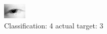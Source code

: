 \begin{figure}[h!]
\begin{center}
\includegraphics[width=0.60\columnwidth]{figures/ID106_class_4_target_3.png}
\end{center}
\caption{ Classification: 4 actual target: 3}
\label{fig:ID106_class_4_target_3}
\end{figure}
